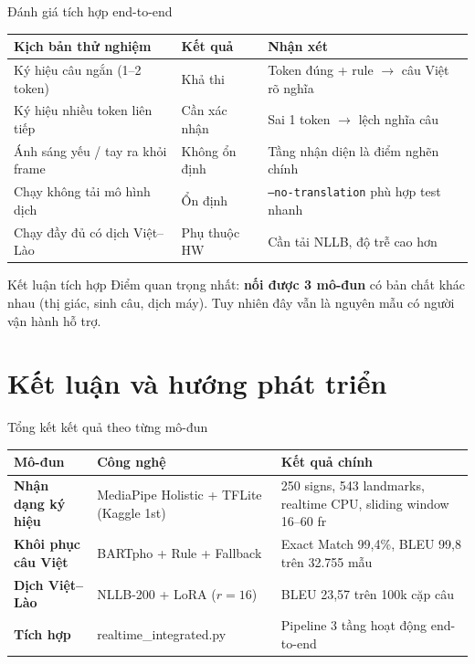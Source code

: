 ﻿\documentclass[aspectratio=169, 11pt]{beamer}
\begin{document}
\begin{frame}{Đánh giá tích hợp end-to-end}
    \centering
    \small
    \begin{tabular}{>{\raggedright}p{4.5cm} >{\centering}p{2.5cm} p{5.5cm}}
        \toprule
        \textbf{Kịch bản thử nghiệm} & \textbf{Kết quả} & \textbf{Nhận xét} \\
        \midrule
        Ký hiệu câu ngắn (1--2 token) & Khả thi & Token đúng + rule $\rightarrow$ câu Việt rõ nghĩa \\[4pt]
        Ký hiệu nhiều token liên tiếp & Cần xác nhận & Sai 1 token $\rightarrow$ lệch nghĩa câu \\[4pt]
        Ánh sáng yếu / tay ra khỏi frame & Không ổn định & Tầng nhận diện là điểm nghẽn chính \\[4pt]
        Chạy không tải mô hình dịch & Ổn định & \texttt{--no-translation} phù hợp test nhanh \\[4pt]
        Chạy đầy đủ có dịch Việt--Lào & Phụ thuộc HW & Cần tải NLLB, độ trễ cao hơn \\
        \bottomrule
    \end{tabular}

    \vspace{0.3cm}
    \begin{alertblock}{Kết luận tích hợp}
        \small Điểm quan trọng nhất: \textbf{nối được 3 mô-đun} có bản chất khác nhau (thị giác, sinh câu, dịch máy). Tuy nhiên đây vẫn là nguyên mẫu có người vận hành hỗ trợ.
    \end{alertblock}
\end{frame}

\section{Kết luận và hướng phát triển}

\begin{frame}{Tổng kết kết quả theo từng mô-đun}
    \centering
    \small
    \begin{tabular}{>{\bfseries}p{3.2cm} p{3.8cm} p{5.5cm}}
        \toprule
        \textbf{Mô-đun} & \textbf{Công nghệ} & \textbf{Kết quả chính} \\
        \midrule
        Nhận dạng ký hiệu & MediaPipe Holistic + TFLite (Kaggle 1st) & 250 signs, 543 landmarks, realtime CPU, sliding window 16--60 fr \\[4pt]
        Khôi phục câu Việt & BARTpho + Rule + Fallback & Exact Match 99,4\%, BLEU 99,8 trên 32.755 mẫu \\[4pt]
        Dịch Việt--Lào & NLLB-200 + LoRA ($r=16$) & BLEU 23,57 trên 100k cặp câu \\[4pt]
        Tích hợp & realtime\_integrated.py & Pipeline 3 tầng hoạt động end-to-end \\
        \bottomrule
    \end{tabular}
\end{frame}
\end{document}
